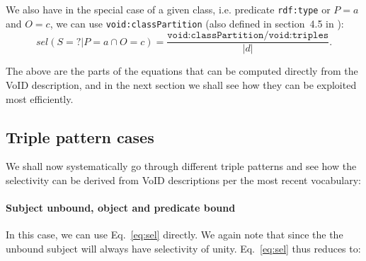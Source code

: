 \documentclass[12pt, draft]{article}
\newcommand{\rdfterm}[1]{\texttt{#1}}
\newcommand{\todo}[1]{\ensuremath{^{\textrm{\tiny{TODO}\normalsize}}}\footnote{\textbf{TODO:}~#1}}
\newcommand{\sel}[1]{\ensuremath{sel\left(#1\right)}}
\begin{document}
We also have in the special case of a given class, i.e. predicate
\rdfterm{rdf:type} or $P = a$ and $O = c$, we can use
\rdfterm{void:classPartition} (also defined in section~4.5 in
\cite{voidnote}):
\begin{equation}\label{eq:selSvPaOc}
 \sel{S = ? | P = a \cap O = c } =
    \frac{\rdfterm{void:classPartition/void:triples}}{|d|} .
\end{equation}

The above are the parts of the equations that can be computed directly
from the VoID description, and in the next section we shall see how
they can be exploited most efficiently.



 
\subsection{Triple pattern cases}

We shall now systematically go through different triple patterns and
see how the selectivity can be derived from VoID descriptions per the
most recent vocabulary\cite{voidnote}:

\paragraph{Subject unbound, object and predicate bound}

In this case, we can use Eq.~\ref{eq:sel} directly. We again note that
since the the unbound subject will always have selectivity of
unity.
Eq.~\ref{eq:sel} thus reduces to:




\end{document}

